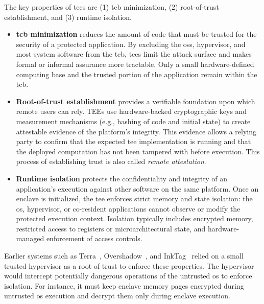 The key properties of \glspl{tee} are (1) \gls{tcb} minimization, (2) root-of-trust establishment, and (3) runtime isolation. \begin{itemize}
	\item \textbf{\gls{tcb} minimization} reduces the amount of code that must be trusted for the security of a protected application.
	      By excluding the \glspl{os}, hypervisor, and most system software from the \gls{tcb}, \glspl{tee} limit the attack surface and makes formal or informal assurance more tractable.
	      Only a small hardware-defined computing base and the trusted portion of the application remain within the \gls{tcb}.
	\item \textbf{Root-of-trust establishment} provides a verifiable foundation upon which remote users can rely.
	      TEEs use hardware-backed cryptographic keys and measurement mechanisms (e.g., hashing of code and initial state) to create attestable evidence of the platform's integrity.
	      This evidence allows a relying party to confirm that the expected \gls{tee} implementation is running and that the deployed computation has not been tampered with before execution.
	      This process of establishing trust is also called \emph{remote attestation}.
	\item \textbf{Runtime isolation} protects the confidentiality and integrity of an application's execution against other software on the same platform.
	      Once an enclave is initialized, the \gls{tee} enforces strict memory and state isolation: the \gls{os}, hypervisor, or co-resident applications cannot observe or modify the protected execution context.
	      Isolation typically includes encrypted memory, restricted access to registers or microarchitectural state, and hardware-managed enforcement of access controls.
\end{itemize}



Earlier systems such as Terra~\cite{terra}, Overshadow~\cite{chen_overshadow_2008}, and InkTag~\cite{hofmann_inktag_nodate} relied on a small trusted hypervisor as a root of trust to enforce these properties.
The hypervisor would intercept potentially dangerous operations of the untrusted \gls{os} to enforce isolation.
For instance, it must keep enclave memory pages encrypted during untrusted \gls{os} execution and decrypt them only during enclave execution.

